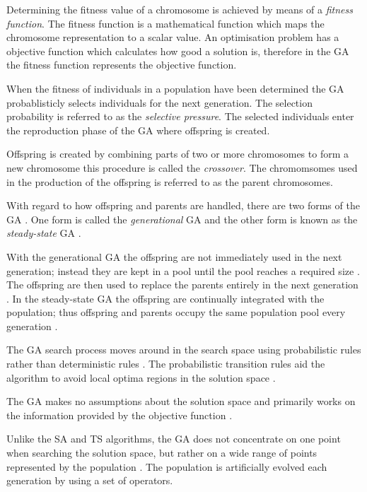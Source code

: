Determining the fitness value of a chromosome is achieved by means of a \emph{fitness function}. The fitness function is a mathematical function which maps the chromosome representation to a scalar value\cite{CompuIntelligenceIntro}. An optimisation problem has a objective function which calculates how good a solution is, therefore in the GA the fitness function represents the objective function\cite{CompuIntelligenceIntro}.

When the fitness of individuals in a population have been determined the GA probablisticly selects individuals for the next generation\cite{CompuIntelligenceIntro}. The selection probability is referred to as the \emph{selective pressure}\cite{CompuIntelligenceIntro}. The selected individuals enter the reproduction phase of the GA where offspring is created.

Offspring is created by combining parts of two or more chromosomes to form a new chromosome this procedure is called the \emph{crossover}\cite{CompuIntelligenceIntro}. The chromomsomes used in the production of the offspring is referred to as the parent chromosomes\cite{CompuIntelligenceIntro}.

With regard to how offspring and parents are handled, there are two forms of the GA \cite{FamilyGA}. One form is called the \emph{generational} GA  and the other form is known as the \emph{steady-state} GA \cite{GeostatisticalGA,FamilyGA}.

With the generational GA the offspring are not immediately used in the next generation; instead they are kept in a pool until the pool reaches a required size \cite{FamilyGA}. The offspring are then used to replace the parents entirely in the next generation \cite{FamilyGA}. In the steady-state GA the offspring are continually integrated with the population; thus offspring and parents occupy the same population pool every generation \cite{GeostatisticalGA,FamilyGA}.

The GA search process moves around in the search space using probabilistic rules rather than deterministic rules \cite{FamilyGA}. The probabilistic transition rules aid the algorithm to avoid local optima regions in the solution space \cite{HybridIntelliGA}. 

The GA makes no assumptions about the solution space and primarily works on the information provided by the objective function \cite{ConstrainedGA,HybridIntelliGA}. 

Unlike the SA and TS algorithms, the GA does not concentrate on one point when searching the solution space, but rather on a wide range of points represented by the population \cite{DistributedHierarchicalGA,FamilyGA,HybridIntelliGA}\label{GASearchPoints}. The population is artificially evolved each generation by using a set of operators\cite{SelfAdaptiveGA}. 


